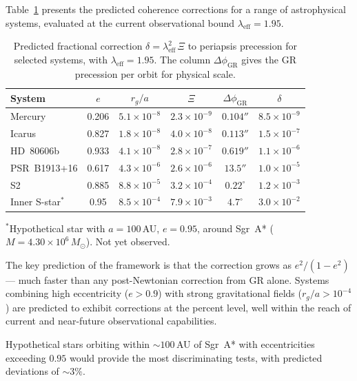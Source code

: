 \documentclass[showpacs,preprintnumbers,amsmath,amssymb,prd,longbibliography]{revtex4-2}
\begin{document}
Table~\ref{tab:predictions} presents the predicted coherence
corrections for a range of astrophysical systems, evaluated
at the current observational bound $\lambda_{\mathrm{eff}} = 1.95$.

\begin{table}[t]
\centering
\caption{Predicted fractional correction $\delta = \lambda_{\mathrm{eff}}^2\,\Xi$
to periapsis precession for selected systems, with
$\lambda_{\mathrm{eff}} = 1.95$.
The column $\Delta\phi_{\mathrm{GR}}$ gives the GR precession
per orbit for physical scale.}
\label{tab:predictions}
\begin{ruledtabular}
\begin{tabular}{lccccc}
System & $e$ & $r_g/a$ & $\Xi$ & $\Delta\phi_{\mathrm{GR}}$ & $\delta$ \\
\hline
Mercury & 0.206 & $5.1\times10^{-8}$ & $2.3\times10^{-9}$ &
$0.104''$ &
$8.5\times10^{-9}$ \\
Icarus & 0.827 & $1.8\times10^{-8}$ & $4.0\times10^{-8}$ &
$0.113''$ &
$1.5\times10^{-7}$ \\
HD~80606b & 0.933 & $4.1\times10^{-8}$ & $2.8\times10^{-7}$ &
$0.619''$ &
$1.1\times10^{-6}$ \\
PSR~B1913+16 & 0.617 & $4.3\times10^{-6}$ & $2.6\times10^{-6}$ &
$13.5''$ &
$1.0\times10^{-5}$ \\
S2 & 0.885 & $8.8\times10^{-5}$ & $3.2\times10^{-4}$ &
$0.22^\circ$ &
$1.2\times10^{-3}$ \\
Inner S-star$^*$ & 0.95 & $8.5\times10^{-4}$ & $7.9\times10^{-3}$ &
$4.7^\circ$ &
$3.0\times10^{-2}$ \\
\end{tabular}
\end{ruledtabular}
\begin{flushleft}
\footnotesize{$^*$Hypothetical star with $a = 100\,$AU, $e=0.95$,
around Sgr~A* ($M = 4.30\times10^6\,M_\odot$). Not yet observed.}
\end{flushleft}
\end{table}

The key prediction of the framework is that the correction
grows as $e^2/(1-e^2)$ --- much faster than any post-Newtonian
correction from GR alone.
Systems combining high eccentricity ($e > 0.9$) with strong
gravitational fields ($r_g/a > 10^{-4}$) are predicted to
exhibit corrections at the percent level, well within the reach
of current and near-future observational capabilities.

Hypothetical stars orbiting within $\sim 100\,$AU of
Sgr~A* with eccentricities exceeding $0.95$ would provide
the most discriminating tests, with predicted deviations
of $\sim 3\%$.
\end{document}
